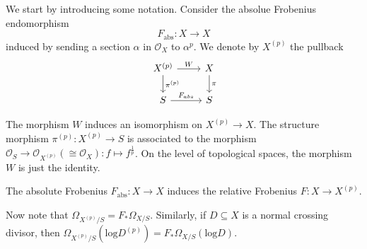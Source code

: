 \documentclass{amsart}
\theoremstyle{definition}
\newcommand\llog{\mathrm{log}}
\numberwithin{equation}{section}
\begin{document}
We start by introducing some notation. Consider the absolue Frobenius endomorphism
\[
F_{\textrm{abs}}: X\to X
\] 
induced by sending a section $\alpha$ in $\mathcal{O}_X$ to $\alpha^p$. We denote by $X^{(p)}$ the pullback
\[
\begin{tikzcd}
	X^{(p)}\ar[r,"W"]\arrow[d,"\pi^{(p)}"]&X\ar[d,"\pi"]\\
	S\ar[r,"F_{\textrm{abs}}"]&S
\end{tikzcd}
\]

The morphism $W$ induces an isomorphism on $X^{(p)}\to X$. The structure morphism $\pi^{(p)}:X^{(p)}\to S$ is associated to the morphism $\mathcal{O}_S\to \mathcal{O}_{X^{(p)}}(\cong\mathcal{O}_X):f\mapsto f^{\frac{1}{p}}$. On the level of topological spaces, the morphism $W$ is just the identity.

The absolute Frobenius $F_{\textrm{abs}}:X\to X$ induces the relative Frobenius $F:X\to X^{(p)}$. 

Now note that $\Omega_{X^{(p)}/S}=F_*\Omega_{X/S}$. Similarly, if $D\subseteq X$ is a normal crossing divisor, then $\Omega_{X^{(p)}/S}(\llog D^{(p)})=F_*\Omega_{X/S}(\llog D)$.
\end{document}
